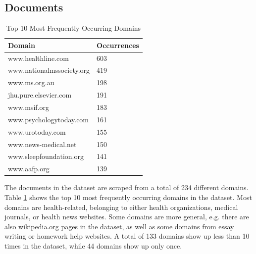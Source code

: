 \subsection{Documents}
\begin{table}[tb]
\centering
\begin{tabular}{ll}
\hline
\textbf{Domain} & \textbf{Occurrences} \\
\hline
www.healthline.com & 603 \\
www.nationalmssociety.org & 419 \\
www.ms.org.au & 198 \\
jhu.pure.elsevier.com & 191 \\
www.msif.org & 183 \\
www.psychologytoday.com & 161 \\
www.urotoday.com & 155 \\
www.news-medical.net & 150 \\
www.sleepfoundation.org & 141 \\
www.aafp.org & 139 \\
\hline
\end{tabular}
\caption{Top 10 Most Frequently Occurring Domains}
\label{tab:top_domains}
\end{table}
The documents in the dataset are scraped from a total of 234 different domains.
Table \ref{tab:top_domains} shows the top 10 most frequently occurring domains in the dataset.
Most domains are health-related, belonging to either health organizations, medical journals, or health news websites.
Some domains are more general, e.g. there are also wikipedia.org pages in the dataset, as well as some domains from essay writing or homework help websites.
A total of 133 domains show up less than 10 times in the dataset, while 44 domains show up only once.

